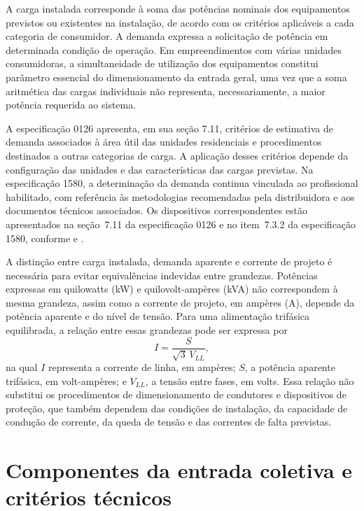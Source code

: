 A carga instalada corresponde à soma das potências nominais dos equipamentos previstos ou existentes na instalação, de acordo com os critérios aplicáveis a cada categoria de consumidor. A demanda expressa a solicitação de potência em determinada condição de operação. Em empreendimentos com várias unidades consumidoras, a simultaneidade de utilização dos equipamentos constitui parâmetro essencial do dimensionamento da entrada geral, uma vez que a soma aritmética das cargas individuais não representa, necessariamente, a maior potência requerida ao sistema.

A especificação 0126 apresenta, em sua seção 7.11, critérios de estimativa de demanda associados à área útil das unidades residenciais e procedimentos destinados a outras categorias de carga. A aplicação desses critérios depende da configuração das unidades e das características das cargas previstas. Na especificação 1580, a determinação da demanda continua vinculada ao profissional habilitado, com referência às metodologias recomendadas pela distribuidora e aos documentos técnicos associados. Os dispositivos correspondentes estão apresentados na seção~7.11 da especificação 0126 e no item~7.3.2 da especificação 1580, conforme  e .

A distinção entre carga instalada, demanda aparente e corrente de projeto é necessária para evitar equivalências indevidas entre grandezas. Potências expressas em quilowatts (kW) e quilovolt-ampères (kVA) não correspondem à mesma grandeza, assim como a corrente de projeto, em ampères (A), depende da potência aparente e do nível de tensão. Para uma alimentação trifásica equilibrada, a relação entre essas grandezas pode ser expressa por
\begin{equation}
 I = \frac{S}{\sqrt{3}\,V_{LL}},
 \label{eq:corrente-trifasica}
\end{equation}
na qual $I$ representa a corrente de linha, em ampères; $S$, a potência aparente trifásica, em volt-ampères; e $V_{LL}$, a tensão entre fases, em volts. Essa relação não substitui os procedimentos de dimensionamento de condutores e dispositivos de proteção, que também dependem das condições de instalação, da capacidade de condução de corrente, da queda de tensão e das correntes de falta previstas.

\section{Componentes da entrada coletiva e critérios técnicos}
\label{sec:componentes}

